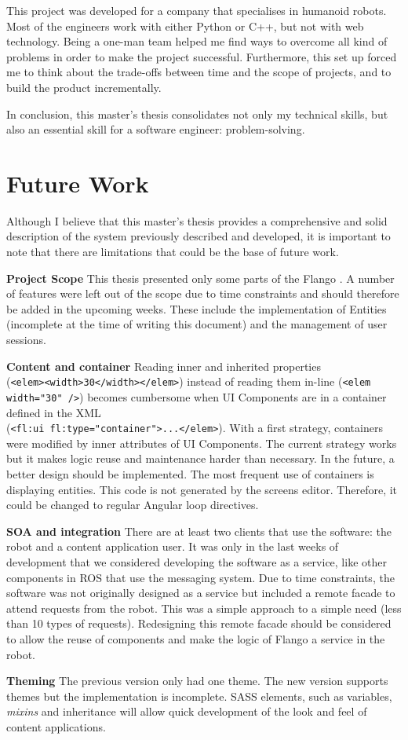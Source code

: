 This project was developed for a company that specialises in humanoid robots.
Most of the engineers work with either Python or C++, but not with web technology.
Being a one-man team helped me find ways to overcome all kind of problems in order to make the project successful.
Furthermore, this set up forced me to think about the trade-offs between time and the scope of projects, and to build the product incrementally.

In conclusion, this master's thesis consolidates not only my technical skills, but also an essential skill for a software engineer: problem-solving.


\section{Future Work}
Although I believe that this master's thesis provides a comprehensive and solid description of the system previously described and developed, it is important to note that there are limitations that could be the base of  future work.

\textbf{Project Scope} This thesis presented only some parts of the Flango \cm . 
A number of features were left out of the scope due to time constraints and should therefore be added in the upcoming weeks.
These include the implementation of Entities (incomplete at the time of writing this document) and the management of user sessions.

\textbf{Content and container} Reading inner and inherited properties \\(\lstinline$<elem><width>30</width></elem>$) instead of reading them in-line (\lstinline$<elem width="30" />$) becomes cumbersome when UI Components are in a container defined in the \ac{XML} \\ (\lstinline$<fl:ui fl:type="container">...</elem>$).
With a first strategy, containers were modified by inner attributes of UI Components.
The current strategy works but it makes logic reuse and maintenance harder than necessary.
In the future, a better design should be implemented.
The most frequent use of containers is displaying entities.
This code is not generated by the screens editor. 
Therefore, it could be changed to regular Angular loop directives.

\textbf{SOA and integration} There are at least two clients that use the software: the robot and a content application user.
It was only in the last weeks of development that we considered developing the software as a service, like other components in \ac{ROS} that use the messaging system.
Due to time constraints, the software was not originally designed as a service but included a remote facade to attend requests from the robot.
This was a simple approach to a simple need (less than 10 types of requests).
Redesigning this remote facade should be considered to allow the reuse of components and make the logic of Flango \cm a service in the robot.

\textbf{Theming} The previous version only had one theme.
The new version supports themes but the implementation is incomplete.
\ac{SASS} elements, such as variables, \textit{mixins} and inheritance will allow quick development of the look and feel of content applications.

